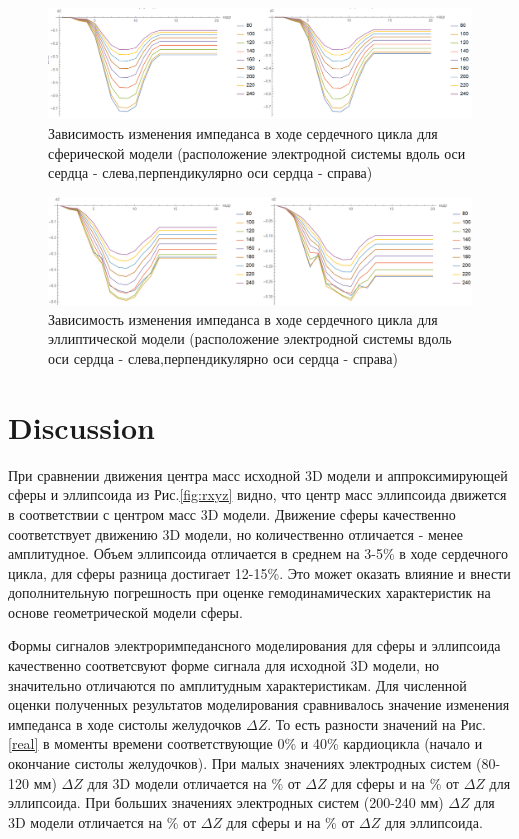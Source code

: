 \documentclass[conference]{IEEEtran}
\begin{document}
\begin{figure}[tbph]
    \centering
    \includegraphics[width=\linewidth]{fig/sphere}
    \caption{Зависимость изменения импеданса в ходе сердечного цикла для сферической модели (расположение электродной системы вдоль оси сердца - слева,перпендикулярно оси сердца - справа)}
    \label{fig:sphere}
\end{figure}

\begin{figure}[tbph]
    \centering
    \includegraphics[width=\linewidth]{ellipse}
    \caption{Зависимость изменения импеданса в ходе сердечного цикла для эллиптической модели (расположение электродной системы вдоль оси сердца - слева,перпендикулярно оси сердца - справа)}
    \label{fig:ellipse}
\end{figure}



\section{Discussion}

При сравнении движения центра масс исходной 3D модели и аппроксимирующей сферы и эллипсоида из Рис.\ref{fig:rxyz} видно,
что центр масс эллипсоида движется в соответствии с центром масс 3D модели.
Движение сферы качественно соответствует движению 3D модели, но количественно отличается - менее амплитудное.
Объем эллипсоида отличается в среднем на 3-5\% в ходе сердечного цикла, для сферы разница достигает 12-15\%.
Это может оказать влияние и внести дополнительную погрешность при оценке гемодинамических характеристик на основе геометрической модели сферы.

Формы сигналов электроримпедансного моделирования для сферы и эллипсоида качественно соответсвуют форме сигнала для исходной 3D модели, но значительно отличаются по амплитудным характеристикам.
Для численной оценки полученных результатов моделирования сравнивалось значение изменения импеданса в ходе систолы желудочков $\Delta Z$.
То есть разности значений  на Рис.\ref{real}  в моменты времени соответствующие 0\% и 40\% кардиоцикла (начало и окончание систолы желудочков).
При малых значениях электродных систем (80-120 мм) $\Delta Z$ для 3D модели отличается на \%  от $\Delta Z$ для сферы и на \% от $\Delta Z$ для эллипсоида.
При больших значениях электродных систем (200-240 мм) $\Delta Z$ для 3D модели отличается на \%  от $\Delta Z$ для сферы и на \% от $\Delta Z$ для эллипсоида.
\end{document}
